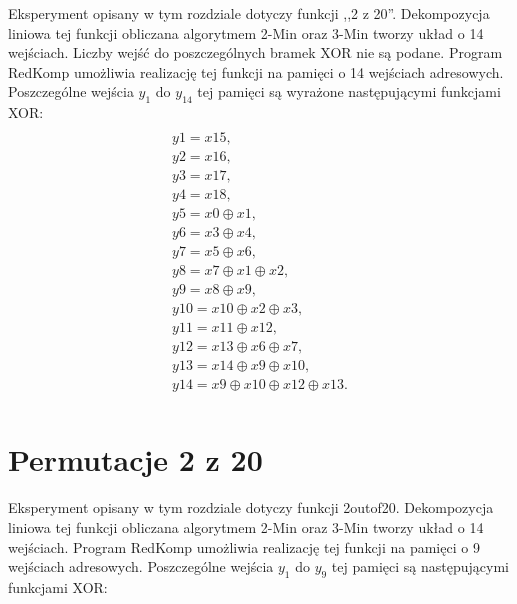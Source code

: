 Eksperyment opisany w tym rozdziale dotyczy funkcji ,,2 z 20''.
Dekompozycja liniowa tej funkcji obliczana algorytmem 2-Min oraz 3-Min \cite{sasao-s-min} tworzy układ o 14 wejściach.
Liczby wejść do poszczególnych bramek XOR nie są podane.
Program RedKomp umożliwia realizację tej funkcji na pamięci o 14 wejściach adresowych.
Poszczególne wejścia $y_1$ do $y_14$ tej pamięci są wyrażone następującymi funkcjami XOR:
\begin{multline} \\
y1 = x15, \\
y2 = x16, \\
y3 = x17, \\
y4 = x18, \\
y5 = x0 \oplus x1, \\
y6 = x3 \oplus x4, \\
y7 = x5 \oplus x6, \\
y8 = x7 \oplus x1 \oplus x2, \\
y9 = x8 \oplus x9, \\
y10 = x10 \oplus x2 \oplus x3, \\
y11 = x11 \oplus x12, \\
y12 = x13 \oplus x6 \oplus x7, \\
y13 = x14 \oplus x9 \oplus x10, \\
y14 = x9 \oplus x10 \oplus x12 \oplus x13. \\
\end{multline}

\section{Permutacje 2 z 20}

Eksperyment opisany w tym rozdziale dotyczy funkcji 2outof20.
Dekompozycja liniowa tej funkcji obliczana algorytmem 2-Min oraz 3-Min \cite{sasao-s-min} tworzy układ o 14 wejściach.
Program RedKomp umożliwia realizację tej funkcji na pamięci o 9 wejściach adresowych.
Poszczególne wejścia $y_1$ do $y_9$ tej pamięci są następującymi funkcjami XOR:

